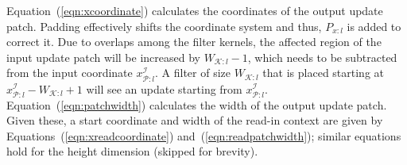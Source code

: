 




Equation~(\ref{eqn:xcoordinate}) calculates the coordinates of the output update patch. Padding effectively shifts the coordinate system and thus, $P_{x:l}$ is added to correct it. Due to overlaps among the filter kernels, the affected region of the input update patch will be increased by $W_{\mathcal{K}:l}-1$, which needs to be subtracted from the input coordinate $x^\mathcal{I}_{\mathcal{P}:l}$. A filter of size $W_{\mathcal{K}:l}$ that is placed starting at $x^\mathcal{I}_{\mathcal{P}:l} - W_{\mathcal{K}:l} + 1$ will see an update starting from $x^\mathcal{I}_{\mathcal{P}:l}$. Equation~(\ref{eqn:patchwidth}) calculates the width of the output update patch. Given these, a start coordinate and width of the read-in context are given by Equations~(\ref{eqn:xreadcoordinate}) and~(\ref{eqn:readpatchwidth}); similar equations hold for the height dimension (skipped for brevity).


